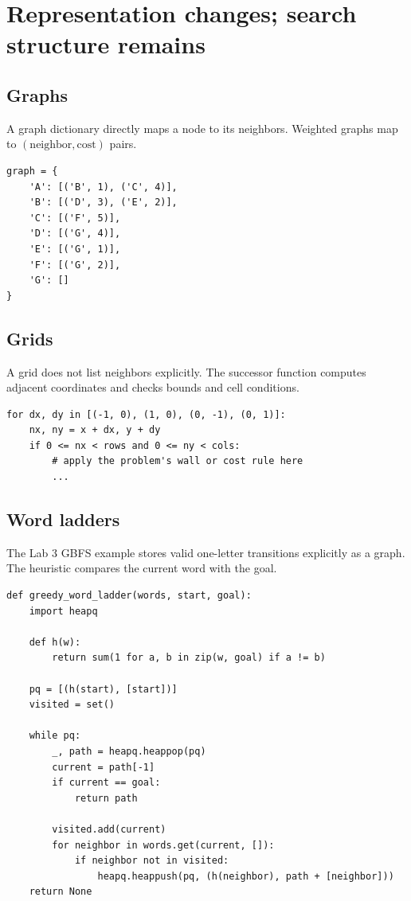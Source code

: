 \section{Representation changes; search structure remains}

\subsection{Graphs}
A graph dictionary directly maps a node to its neighbors. Weighted graphs map to \((\text{neighbor},\text{cost})\) pairs.

\begin{lstlisting}[style=mlpython]
graph = {
    'A': [('B', 1), ('C', 4)],
    'B': [('D', 3), ('E', 2)],
    'C': [('F', 5)],
    'D': [('G', 4)],
    'E': [('G', 1)],
    'F': [('G', 2)],
    'G': []
}
\end{lstlisting}

\subsection{Grids}
A grid does not list neighbors explicitly. The successor function computes adjacent coordinates and checks bounds and cell conditions.

\begin{lstlisting}[style=mlpython]
for dx, dy in [(-1, 0), (1, 0), (0, -1), (0, 1)]:
    nx, ny = x + dx, y + dy
    if 0 <= nx < rows and 0 <= ny < cols:
        # apply the problem's wall or cost rule here
        ...
\end{lstlisting}

\subsection{Word ladders}
The Lab 3 GBFS example stores valid one-letter transitions explicitly as a graph. The heuristic compares the current word with the goal.

\begin{lstlisting}[style=mlpython]
def greedy_word_ladder(words, start, goal):
    import heapq

    def h(w):
        return sum(1 for a, b in zip(w, goal) if a != b)

    pq = [(h(start), [start])]
    visited = set()

    while pq:
        _, path = heapq.heappop(pq)
        current = path[-1]
        if current == goal:
            return path

        visited.add(current)
        for neighbor in words.get(current, []):
            if neighbor not in visited:
                heapq.heappush(pq, (h(neighbor), path + [neighbor]))
    return None
\end{lstlisting}

